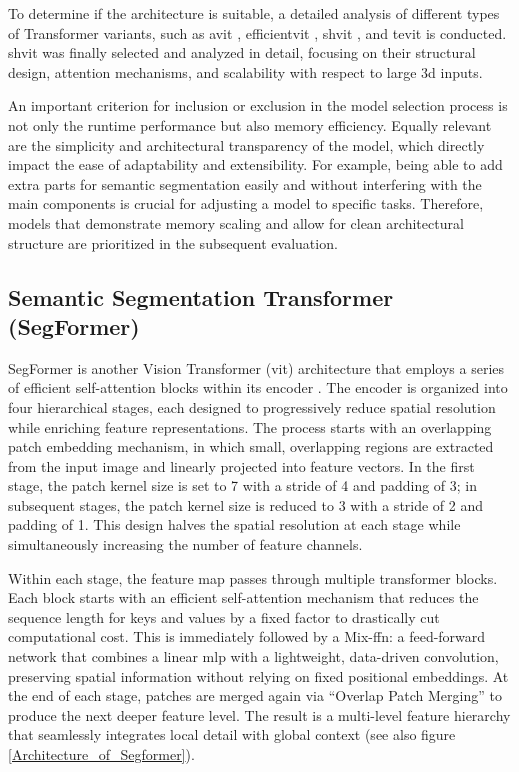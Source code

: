 \medskip

To determine if the architecture is suitable, a detailed analysis of different types of Transformer variants, such as \gls{avit} \cite{du2024avitadaptingvisiontransformers}, \gls{efficientvit} \cite{liu2023efficientvitmemoryefficientvision}, \gls{shvit} \cite{yun2024shvit}, and \gls{tevit} \cite{yang2022temporallyefficientvisiontransformer} is conducted. \gls{shvit} was finally selected and analyzed in detail, focusing on their structural design, attention mechanisms, and scalability with respect to large \gls{3d} inputs. 

\medskip

An important criterion for inclusion or exclusion in the model selection process is not only the runtime performance but also memory efficiency. Equally relevant are the simplicity and architectural transparency of the model, which directly impact the ease of adaptability and extensibility. For example, being able to add extra parts for semantic segmentation easily and without interfering with the main components is crucial for adjusting a model to specific tasks. Therefore, models that demonstrate memory scaling and allow for clean architectural structure are prioritized in the subsequent evaluation.




\subsection{Semantic Segmentation Transformer (SegFormer)} \label{sec:segformer}
SegFormer is another Vision Transformer (\gls{vit}) architecture that employs a series of efficient self-attention blocks within its encoder \cite{xie2021segformersimpleefficientdesign, perera2024segformer3defficienttransformer3d}. The encoder is organized into four hierarchical stages, each designed to progressively reduce spatial resolution while enriching feature representations. The process starts with an overlapping patch embedding mechanism, in which small, overlapping regions are extracted from the input image and linearly projected into feature vectors. In the first stage, the patch kernel size is set to 7 with a stride of 4 and padding of 3; in subsequent stages, the patch kernel size is reduced to 3 with a stride of 2 and padding of 1. This design halves the spatial resolution at each stage while simultaneously increasing the number of feature channels.

\medskip

Within each stage, the feature map passes through multiple transformer blocks. Each block starts with an efficient self-attention mechanism that reduces the sequence length for keys and values by a fixed factor to drastically cut computational cost. This is immediately followed by a Mix-\gls{ffn}: a feed-forward network that combines a linear \gls{mlp} with a lightweight, data-driven convolution, preserving spatial information without relying on fixed positional embeddings. At the end of each stage, patches are merged again via \enquote{Overlap Patch Merging} to produce the next deeper feature level. The result is a multi-level feature hierarchy that seamlessly integrates local detail with global context (see also figure \ref{Architecture_of_Segformer}).

